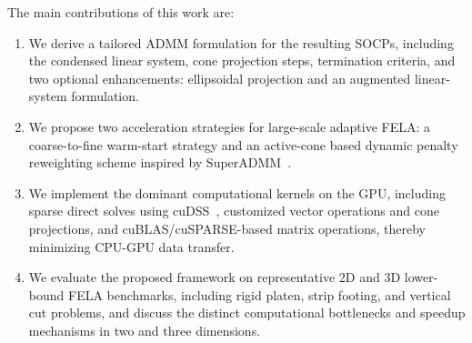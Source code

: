 The main contributions of this work are:

\begin{enumerate}
  \item We derive a tailored ADMM formulation for the resulting SOCPs, including the condensed linear system, cone projection steps, termination criteria, and two optional enhancements: ellipsoidal projection and an augmented linear-system formulation.
  \item We propose two acceleration strategies for large-scale adaptive FELA: a coarse-to-fine warm-start strategy and an active-cone based dynamic penalty reweighting scheme inspired by SuperADMM~\cite{SuperADMM}.
  \item We implement the dominant computational kernels on the GPU, including sparse direct solves using cuDSS~\cite{CUDSS}, customized vector operations and cone projections, and cuBLAS/cuSPARSE-based matrix operations, thereby minimizing CPU-GPU data transfer.
  \item We evaluate the proposed framework on representative 2D and 3D lower-bound FELA benchmarks, including rigid platen, strip footing, and vertical cut problems, and discuss the distinct computational bottlenecks and speedup mechanisms in two and three dimensions.
\end{enumerate}

